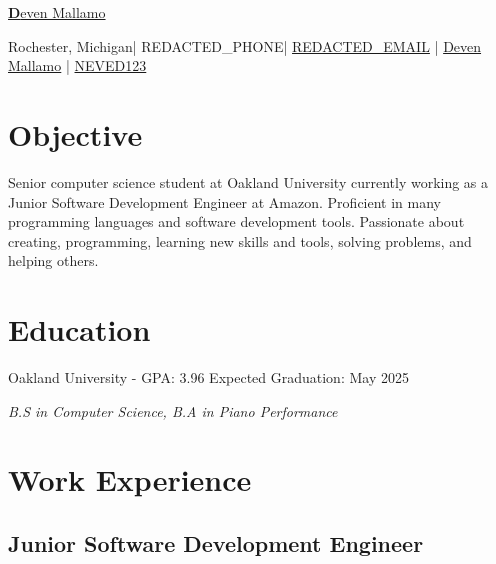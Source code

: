 \documentclass{article}
\newcommand{\resumesection}[1]{
	\section*{\Large\textbf{#1}}
	\hrulefill
	\vspace{1ex}
}
\newcommand{\name}{Deven Mallamo}
\newcommand{\address}{Rochester, Michigan}
\newcommand{\phone}{REDACTED_PHONE}
\newcommand{\email}{REDACTED_EMAIL}
\newcommand{\linkedin}{Deven Mallamo}
\newcommand{\github}{NEVED123}
\begin{document}
\begin{tcolorbox}[colback= boxfill,colframe=boxframe]
	\begin{center}
		\vspace{5pt}
		\href{https://www.devenmallamo.com}{\Huge \textbf \name} 

		\normalsize \vspace{10pt}

		\faHome \space \address \space | 
		\faPhone \space \phone \space |
		\href{mailto:\email}{\faEnvelope \space \email} \space | 
		\href{https://www.linkedin.com/in/deven-mallamo/}{\faLinkedin \space \linkedin} \space | 
		\href{https://github.com/NEVED123}{\faGithub \space \github} 
	\end{center}
\end{tcolorbox}

\vspace{1ex}

\resumesection{Objective}

\vspace{.2ex}	

Senior computer science student at Oakland University currently working as a Junior Software Development Engineer at Amazon. Proficient in many programming languages and software development tools. Passionate about creating, programming, \hspace{49152sp}learning new skills and tools, solving problems, and helping others.

\vspace{.5ex}	


\resumesection{Education}

\vspace{.2ex}	

Oakland University - GPA: 3.96 \hfill Expected Graduation: May 2025

\textit {B.S in Computer Science, B.\hspace{49152sp}A in Piano Performance} 

\vspace{.5ex}


\resumesection{Work Experience}

\subsection*{Junior Software Development Engineer} 
\end{document}
